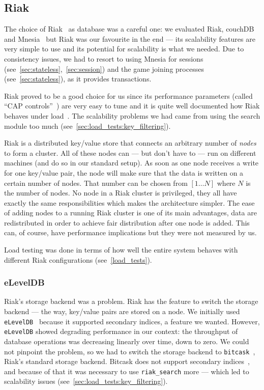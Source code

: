 \documentclass[11pt,a4paper]{report}
\begin{document}
\subsection{Riak}
\label{sec:riak}
The choice of Riak~\cite{riak} as database was a careful one: we evaluated Riak,
couchDB~\cite{couchdb} and Mnesia~\cite{mnesia} but Riak was our favourite in the
end --- its scalability features are very simple to use and its potential for
scalability is what we needed. Due to consistency issues, we had to resort to
using Mnesia for sessions (see~\ref{sec:stateless},~\ref{sec:session}) and the game joining
processes (see~\ref{sec:stateless}), as it provides transactions.

Riak proved to be a good choice for us since its performance parameters (called
``CAP controls''~\cite{cap_controls}) are very easy to tune and it
is quite well documented how Riak behaves under load~\cite{mozilla_riak, joyent_riak}.
The scalability problems we had came from using the search
module too much (see~\ref{sec:load_tests:key_filtering}).

Riak is a distributed key/value store that connects an arbitrary number of
{\em nodes} to form a cluster. All of these nodes can --- but don't have to ---
run on different machines (and do so in our standard setup). As soon as one
node receives a write for one key/value pair, the node will make sure that the
data is written on a certain number of nodes. That number can be chosen from
$[1 \ldots N]$ where $N$ is the number of nodes.
No node in a Riak cluster is privileged, they all have exactly the same
responsibilities which makes the architecture simpler.
The ease of adding nodes to a running Riak cluster is one of its main
advantages, data are redistributed in order to achieve fair distribution after
one node is added. This can, of course, have performance implications but they
were not measured by us.

Load testing was done in terms of how well the entire system behaves with different
Riak configurations (see~\ref{load_tests}).

\subsubsection{eLevelDB}
Riak's storage backend was a problem. Riak has the feature to switch the
storage backend --- the way, key/value pairs are stored on a node.
We initially used {\tt eLevelDB}~\cite{eleveldb} because it supported secondary indices, a
feature we wanted. However, {\tt eLevelDB} showed degrading performance
in our context: the throughput of database operations was decreasing linearly
over time, down to zero. We could not pinpoint the problem, so we had to switch
the storage backend to {\tt bitcask}~\cite{bitcask}, Riak's standard storage backend.
Bitcask does not support secondary
indices~\cite{secondary_idx}\cite{secondary_idx_riak},
and because of that it was necessary to use
{\tt riak\_search} more --- which led to scalability
issues (see~\ref{sec:load_tests:key_filtering}).
\end{document}
